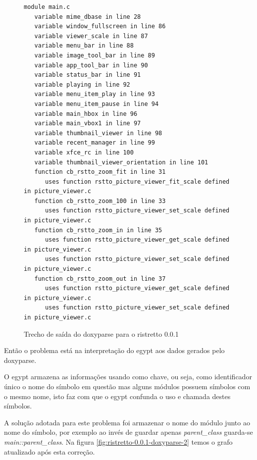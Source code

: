 \begin{figure}[h]
\begin{Verbatim}[frame=single,fontsize=\relsize{-3},fontfamily=courier]
module main.c
   variable mime_dbase in line 28
   variable window_fullscreen in line 86
   variable viewer_scale in line 87
   variable menu_bar in line 88
   variable image_tool_bar in line 89
   variable app_tool_bar in line 90
   variable status_bar in line 91
   variable playing in line 92
   variable menu_item_play in line 93
   variable menu_item_pause in line 94
   variable main_hbox in line 96
   variable main_vbox1 in line 97
   variable thumbnail_viewer in line 98
   variable recent_manager in line 99
   variable xfce_rc in line 100
   variable thumbnail_viewer_orientation in line 101
   function cb_rstto_zoom_fit in line 31
      uses function rstto_picture_viewer_fit_scale defined in picture_viewer.c
   function cb_rstto_zoom_100 in line 33
      uses function rstto_picture_viewer_set_scale defined in picture_viewer.c
   function cb_rstto_zoom_in in line 35
      uses function rstto_picture_viewer_get_scale defined in picture_viewer.c
      uses function rstto_picture_viewer_set_scale defined in picture_viewer.c
   function cb_rstto_zoom_out in line 37
      uses function rstto_picture_viewer_get_scale defined in picture_viewer.c
      uses function rstto_picture_viewer_set_scale defined in picture_viewer.c
\end{Verbatim}
\caption{Trecho de saída do doxyparse para o ristretto 0.0.1}
\label{fig:trecho-saida-doxyparse-ristretto}
\end{figure}

Então o problema está na interpretação do egypt aos dados gerados pelo
doxyparse.

O egypt armazena as informações usando como chave, ou seja, como identificador
único o nome do símbolo em questão mas alguns módulos possuem símbolos com o
mesmo nome, isto faz com que o egypt confunda o uso e chamada destes símbolos.

A solução adotada para este problema foi armazenar o nome do módulo junto ao
nome do símbolo, por exemplo ao invés de guardar apenas {\it parent\_class}
guarda-se {\it main::parent\_class}. Na figura
\ref{fig:ristretto-0.0.1-doxyparse-2} temos o grafo atualizado após esta
correção.

